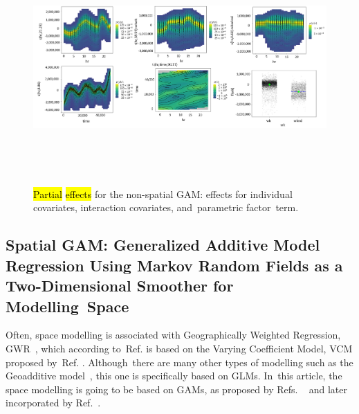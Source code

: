 \documentclass[energies,article,accept,pdftex,moreauthors]{Definitions/mdpi}
\begin{document}
     \begin{figure}[H]
		\includegraphics[height=9cm, width=14.5cm]{figs/Partial_Effects_Plot_Non_Spatial.png}
	\caption{\hl{Partial} %
         \hl{effects} %
        for the non-spatial GAM: effects for individual covariates, interaction covariates, and~parametric factor~term. \label{fig:7}}
    \end{figure}
\unskip
    
    
     \subsection{Spatial GAM: Generalized Additive Model Regression Using Markov Random Fields as a Two-Dimensional Smoother for Modelling~Space}

     
     Often, space modelling is associated with Geographically Weighted Regression,  \linebreak GWR~\citep{Fotheringham2002GeographicallyRelationships}, which according to~Ref. \citep{Fahrmeir2004PENALIZEDPERSPECTIVE} is based on the Varying Coefficient Model, VCM proposed by~Ref. \citep{Hastie1993Varying-CoefficientModels}. Although~there are many other types of modelling such as the Geoadditive model~\citep{Kammann2003GeoadditiveModels}, this one is specifically based on GLMs. In~this article, the space modelling is going to be based on GAMs, as proposed by Refs. ~\citep{Fahrmeir2004PENALIZEDPERSPECTIVE,Fahrmeir2011BayesianData} and later incorporated by Ref.~\citep{Wood2017GeneralizedR}. 
     
\end{document}
